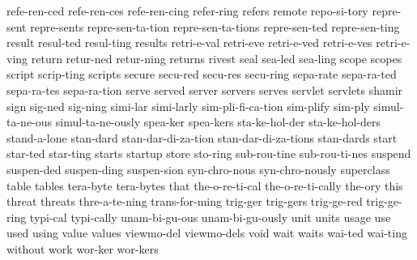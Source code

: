 {    refe-ren-ced
    refe-ren-ces
    refe-ren-cing
    refer-ring
    refers
    remote
    repo-si-tory
    repre-sent
    repre-sents
    repre-sen-ta-tion
    repre-sen-ta-tions
    repre-sen-ted
    repre-sen-ting
    result
    resul-ted
    resul-ting
    results
    retri-e-val
    retri-eve
    retri-e-ved
    retri-e-ves
    retri-e-ving
    return
    retur-ned
    retur-ning
    returns
    rivest
    seal
    sea-led
    sea-ling
    scope
    scopes
    script
    scrip-ting
    scripts
    secure
    secu-red
    secu-res
    secu-ring
    sepa-rate
    sepa-ra-ted
    sepa-ra-tes
    sepa-ra-tion
    serve
    served
    server
    servers
    serves
    servlet
    servlets
    shamir
    sign
    sig-ned
    sig-ning
    simi-lar
    simi-larly
    sim-pli-fi-ca-tion
    sim-plify
    sim-ply
    simul-ta-ne-ous
    simul-ta-ne-ously
    spea-ker
    spea-kers
    sta-ke-hol-der
    sta-ke-hol-ders
    stand-a-lone
    stan-dard
    stan-dar-di-za-tion
    stan-dar-di-za-tions
    stan-dards
    start
    star-ted
    star-ting
    starts
    startup
    store
    sto-ring
    sub-rou-tine
    sub-rou-ti-nes
    suspend
    suspen-ded
    suspen-ding
    suspen-sion
    syn-chro-nous
    syn-chro-nously
    superclass
    table
    tables
    tera-byte
    tera-bytes
    that
    the-o-re-ti-cal
    the-o-re-ti-cally
    the-ory
    this
    threat
    threats
    thre-a-te-ning
    trans-for-ming
    trig-ger
    trig-gers
    trig-ge-red
    trig-ge-ring
    typi-cal
    typi-cally
    unam-bi-gu-ous
    unam-bi-gu-ously
    unit
    units
    usage
    use
    used
    using
    value
    values
    viewmo-del
    viewmo-dels
    void
    wait
    waits
    wai-ted
    wai-ting
    without
    work
    wor-ker
    wor-kers
}
